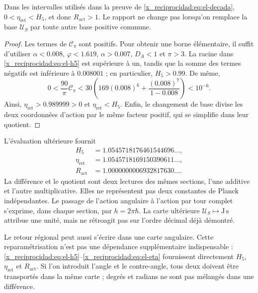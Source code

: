 \begin{proposition}
Dans les intervalles utilisés dans la preuve de \eqref{x_reciprocidad:eq:el-decada},
\(0<\eta_{\mathrm{ret}}<H_5\), et donc
\(R_{\mathrm{act}}>1\). Le rapport ne change pas lorsqu'on remplace la base
\(\mathcal U_S\) par toute autre base positive commune.
\end{proposition}
\begin{proof}
Les termes de \(\mathcal C_\pi\) sont positifs. Pour obtenir une borne
élémentaire, il suffit d'utiliser \(\alpha<0.008\), \(\varphi<1.619\),
\(\alpha>0.007\), \(D_A<1\) et \(\pi>3\). La racine dans
\eqref{x_reciprocidad:eq:el-h5} est supérieure à un, tandis que la somme des termes
négatifs est inférieure à \(0.008001\) ; en particulier, \(H_5>0.99\).
De même,
\[
 0<\frac{90}{\pi}\mathcal C_\pi
 <30\left(169(0.008)^6+
           \frac{(0.008)^7}{1-0.008}\right)<10^{-6}.
\]
Ainsi, \(\eta_{\mathrm{ret}}>0.989999>0\) et
\(\eta_{\mathrm{ret}}<H_5\). Enfin, le changement de base divise
les deux coordonnées d'action par le même facteur positif, qui se simplifie dans
leur quotient.
\end{proof}

L'évaluation ultérieure fournit
\begin{align*}
 H_5&=1.0545718176461544696\ldots,\\
 \eta_{\mathrm{ret}}&=1.0545718169150390611\ldots,\\
 R_{\mathrm{act}}&=1.0000000006932817630\ldots.
\end{align*}
La différence et le quotient sont deux lectures des mêmes sections,
l'une additive et l'autre multiplicative. Elles ne représentent pas deux constantes de
Planck indépendantes. Le passage de l'action angulaire à l'action par tour
complet s'exprime, dans chaque section, par
\(h=2\pi\hbar\). La carte ultérieure
\(\mathcal U_S\mapsto\mathrm{J\,s}\) attribue une unité, mais ne
rétroagit pas sur l'ordre décimal déjà démontré.

Le retour régional peut aussi s'écrire dans une carte angulaire.
Cette reparamétrisation n'est pas une dépendance supplémentaire indispensable :
\eqref{x_reciprocidad:eq:el-h5}--\eqref{x_reciprocidad:eq:el-eta} fournissent directement
\(H_5\), \(\eta_{\mathrm{ret}}\) et \(R_{\mathrm{act}}\). Si l'on
introduit l'angle et le contre-angle, tous deux doivent être transportés dans la même
carte ; degrés et radians ne sont pas mélangés dans une différence.


